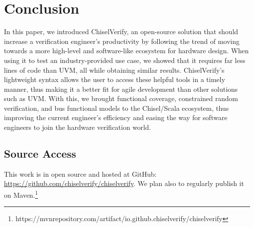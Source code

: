 \documentclass[conference]{IEEEtran}
\begin{document}
\section{Conclusion}
In this paper, we introduced ChiselVerify, an open-source solution that should increase a verification engineer's productivity by following the trend of moving towards a more high-level and software-like ecosystem for hardware design. 
When using it to test an industry-provided use case, we showed that it requires far less lines of code than UVM, all while obtaining similar results.
ChiselVerify's lightweight syntax allows the user to access these helpful tools in a timely manner, thus making it a better fit for agile development than other solutions such as UVM.
With this, we brought functional coverage, constrained random verification, and bus functional models to the Chisel/Scala ecosystem, thus improving the current engineer's efficiency and easing the way for software engineers to join the hardware verification world.

\subsection*{Source Access}

This work is in open source and hosted at GitHub:\\ \url{https://github.com/chiselverify/chiselverify}.
We plan also to regularly publish it on Maven.\footnote{https://mvnrepository.com/artifact/io.github.chiselverify/chiselverify}



\end{document}
